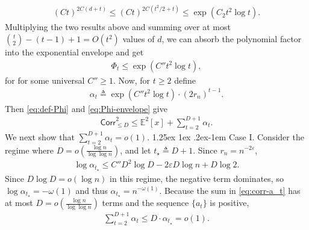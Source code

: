 \documentclass[12pt]{article}
\makeatletter
\newcommand{\p}[1]{\left(#1\right)}
\newcommand{\s}[1]{\mathsf{#1}}
\renewcommand{\paragraph}{%
  \@startsection{paragraph}{4}%
  {\z@}{1.25ex \@plus 1ex \@minus .2ex}{-1em}%
  {\normalfont\normalsize\bfseries}%
}
\makeatother
\begin{document}
\begin{align}
(C t)^{2C(d+t)}\leq(C t)^{2C(t^2/2+t)}\leq\exp\p{C_2t^2\log t}.
\end{align}
Multiplying the two results above and summing over at most $\binom{t}{2}-(t-1)+1=O(t^2)$ values of $d$, we can absorb the polynomial factor into the exponential envelope and get
\begin{align}\label{eq:Phi-envelope}
\Phi_t\leq\exp\p{C''t^2\log t},
\end{align}
for for some universal $C''\geq1$. Now, for $t\geq2$ define
\begin{align}\label{eq:at}
\alpha_t\triangleq\exp\p{C''t^2\log t}\cdot (2r_n)^{t-1}.
\end{align}
Then \eqref{eq:def-Phi} and \eqref{eq:Phi-envelope} give
\begin{align}\label{eq:corr-a_t}
\s{Corr}_{\le D}^2\leq\mathbb{E}^2[x]+\sum_{t=2}^{D+1}\alpha_t.
\end{align}
We next show that $\sum_{t=2}^{D+1} \alpha_t=o(1)$.
\paragraph{Case I.} Consider the regime where $D=o\p{\frac{\log n}{\log\log n}}$, and let $t_\star\triangleq D+1$. Since $r_n=n^{-2\varepsilon}$,
\begin{align}
\log \alpha_{t_\star}\leq C''D^2\log D-2\varepsilon D\log n+D\log 2.
\end{align}
Since $D\log D=o(\log n)$ in this regime, the negative term dominates, so $\log \alpha_{t_\star}=-\omega(1)$ and thus $\alpha_{t_\star}=n^{-\omega(1)}$. Because the sum in \eqref{eq:corr-a_t} has at most $D=o(\frac{\log n}{\log\log n})$ terms and the sequence $\{a_t\}$ is positive,
\begin{align}
\sum_{t=2}^{D+1} \alpha_t\leq D\cdot \alpha_{t_\star}=o(1).
\end{align}
\end{document}
